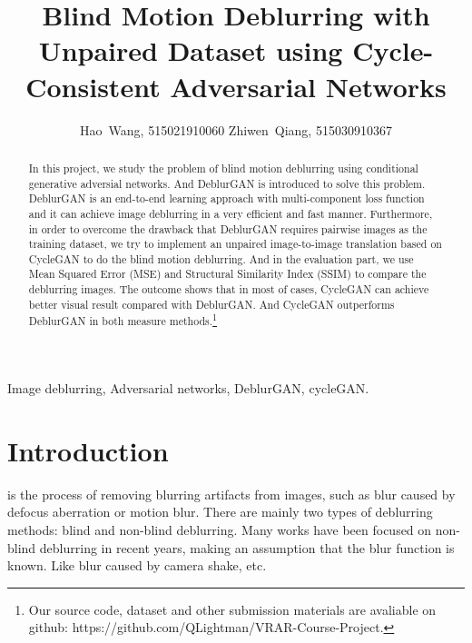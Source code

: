 \documentclass[journal]{IEEEtran}
\begin{document}
\title{Blind Motion Deblurring with Unpaired Dataset using Cycle-Consistent Adversarial Networks}

\author{
Hao~Wang, 515021910060 \qquad Zhiwen~Qiang, 515030910367
}

\maketitle

\begin{abstract}
In this project, we study the problem of blind motion deblurring using conditional generative adversial networks. And DeblurGAN\cite{deblurgan} is introduced to solve this problem. DeblurGAN is an end-to-end learning approach with multi-component loss function and it can achieve image deblurring in a very efficient and fast manner. Furthermore, in order to overcome the drawback that DeblurGAN requires pairwise images as the training dataset, we try to implement an unpaired image-to-image translation based on CycleGAN\cite{cyclegan}  to do the blind motion deblurring. And in the evaluation part, we use Mean Squared Error (MSE) and Structural Similarity Index\cite{ssim} (SSIM) to compare the deblurring images. The outcome shows that in most of cases, CycleGAN can achieve better visual result compared with DeblurGAN. And CycleGAN outperforms DeblurGAN in both measure methods.\footnote{Our source code, dataset and other submission materials are avaliable on github: https://github.com/QLightman/VRAR-Course-Project.}
\end{abstract}
\begin{IEEEkeywords}
Image deblurring, Adversarial networks, DeblurGAN, cycleGAN.
\end{IEEEkeywords}

\IEEEpeerreviewmaketitle

\section{Introduction}
 is the process of removing blurring artifacts from images, such as blur caused by defocus aberration or motion blur. There are mainly two types of deblurring methods: blind and non-blind deblurring. Many works have been focused on non-blind deblurring in recent years, making an assumption that the blur function is known. Like blur caused by camera shake, etc.
\end{document}
